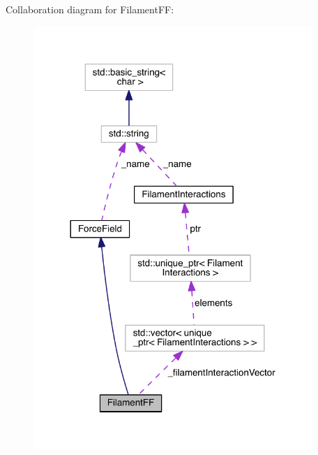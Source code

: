 Collaboration diagram for Filament\+F\+F\+:
\nopagebreak
\begin{figure}[H]
\begin{center}
\leavevmode
\includegraphics[width=300pt]{classFilamentFF__coll__graph}
\end{center}
\end{figure}
